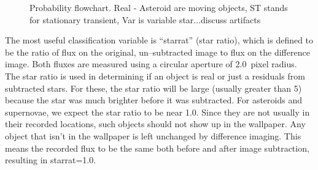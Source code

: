 \documentclass[aps,prb,twocolumn,superscriptaddress]{revtex4-1}
\begin{document}
\begin{figure}[H]
 \caption{\small{Probability flowchart. Real - Asteroid are moving objects, ST stands for stationary transient, Var is variable star...discuss artifacts\label{fig:probflow}}}
\end{figure}



%
The most useful classification variable is ``starrat'' (star ratio), 
which is defined to be the ratio of flux on the original, un--subtracted 
image to flux on the difference image.  Both fluxes are measured using a 
circular aperture of 2.0~pixel radius.  The star ratio is used in 
determining if an object is real or just a residuals from subtracted stars.  
For these, the star ratio will be large (usually greater than 5) because 
the star was much brighter before it was subtracted.  For asteroids and 
supernovae, we expect the star ratio to be near 1.0.  Since they are not 
usually in their recorded locations, such objects should not show up in the wallpaper.  
Any object that isn't in the wallpaper is left unchanged by difference imaging.  
This means the recorded flux to be the same both before and after image subtraction, 
resulting in starrat=1.0.
\end{document}
